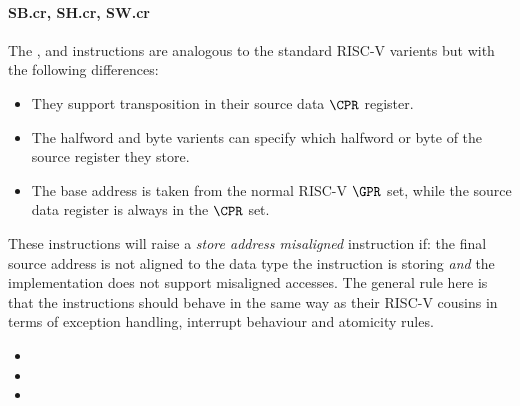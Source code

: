 
\paragraph{SB.cr, SH.cr, SW.cr}

The ,  and  instructions are analogous to
the standard RISC-V varients but with the following differences:

\begin{itemize}
\item They support transposition in their source data $\CPR$ register.
\item The halfword and byte varients can specify which halfword or byte of
      the source register they store.
\item The base address is taken from the normal RISC-V $\GPR$ set, while the
      source data register is always in the $\CPR$ set.
\end{itemize}

These instructions will raise a {\em store address misaligned} instruction
if: the final source address is not aligned to the data type the instruction
is storing {\em and} the implementation does not support misaligned accesses.
The general rule here is that the  instructions should behave in
the same way as their RISC-V cousins in terms of exception handling,
interrupt behaviour and atomicity rules.

\begin{itemize}
\item {}
\item {}
\item {}
\end{itemize}

